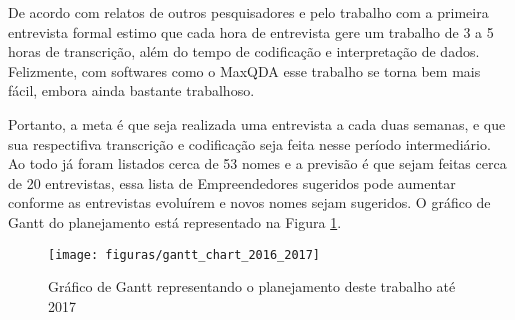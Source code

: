 De acordo com relatos de outros pesquisadores e pelo trabalho com a primeira entrevista formal estimo que cada hora de entrevista gere um trabalho de 3 a 5 horas de transcrição, além do tempo de codificação e interpretação de dados. Felizmente, com softwares como o MaxQDA esse trabalho se torna bem mais fácil, embora ainda bastante trabalhoso. 

Portanto, a meta é que seja realizada uma entrevista a cada duas semanas, e que sua respectifiva transcrição e codificação seja feita nesse período intermediário. Ao todo já foram listados cerca de 53 nomes e a previsão é que sejam feitas cerca de 20 entrevistas, essa lista de Empreendedores sugeridos pode aumentar conforme as entrevistas evoluírem e novos nomes sejam sugeridos. O gráfico de Gantt do planejamento está representado na Figura \ref{figure:gantt_chart_2016_2017}.

\begin{figure}[!htb]
	\centering
	\texttt{[image: figuras/gantt\_chart\_2016\_2017]}
	\caption{Gráfico de Gantt representando o planejamento deste trabalho até 2017}
	\label{figure:gantt_chart_2016_2017}
\end{figure}